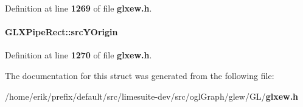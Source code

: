 Definition at line {\bf 1269} of file {\bf glxew.\+h}.

\paragraph[{src\+Y\+Origin}]{ G\+L\+X\+Pipe\+Rect\+::src\+Y\+Origin}\label{structGLXPipeRect_a1f7316dff7050ab2ce9d3d37f8c5450e}


Definition at line {\bf 1270} of file {\bf glxew.\+h}.



The documentation for this struct was generated from the following file\+:\begin{DoxyCompactItemize}
\item 
/home/erik/prefix/default/src/limesuite-\/dev/src/ogl\+Graph/glew/\+G\+L/{\bf glxew.\+h}\end{DoxyCompactItemize}
